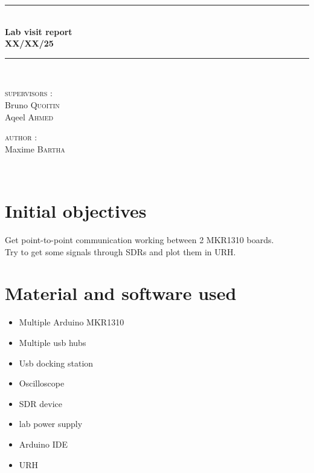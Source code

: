 \documentclass[a4paper, 12pt]{article}
\newcommand{\HRule}{\rule{\linewidth}{0.3mm}}
\begin{document}
\begin{center}
\HRule \\[0.3cm]
{ \LARGE \bfseries Lab visit report \\[0.3cm]}
{ \LARGE \bfseries XX/XX/25 \\[0.1cm]} %
\HRule \\[1.5cm]

\begin{minipage}[t]{0.45\textwidth}
\begin{flushleft} \large
\textsc{supervisors :}\\
Bruno \textsc{Quoitin}\\
Aqeel \textsc{Ahmed}\\
\end{flushleft}

\end{minipage}
\begin{minipage}[t]{0.45\textwidth}
\begin{flushright} \large
\textsc{author :}\\
Maxime \textsc{Bartha}\\
\end{flushright}
\end{minipage}\\[2ex]
\end{center}


\section{Initial objectives}
Get point-to-point communication working between 2 MKR1310 boards.\\
Try to get some signals through SDRs and plot them in URH.

\section{Material and software used}

\begin{itemize}
  \item Multiple Arduino MKR1310
  \item Multiple usb hubs
  \item Usb docking station
  \item Oscilloscope
  \item SDR device
  \item lab power supply
  \item Arduino IDE
  \item URH
\end{itemize}
\end{document}
